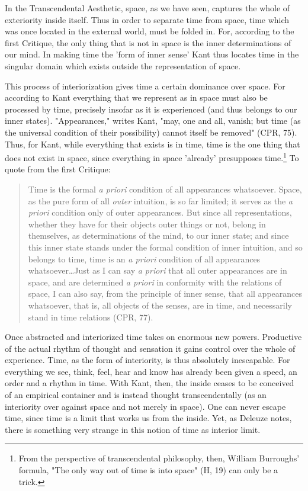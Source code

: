 In the Transcendental Aesthetic, space, as we have seen, captures the whole of exteriority inside itself. Thus in order to separate time from space, time which was once located in the external world, must be folded in. For, according to the first Critique, the only thing that is not in space is the inner determinations of our mind. In making time the 'form of inner sense' Kant thus locates time in the singular domain which exists outside the representation of space.

This process of interiorization gives time a certain dominance over space. For according to Kant everything that we represent as in space must also be processed by time, precisely insofar as it is experienced (and thus belongs to our inner states). "Appearances," writes Kant, "may, one and all, vanish; but time (as the universal condition of their possibility) cannot itself be removed" (CPR, 75). Thus, for Kant, while everything that exists is in time, time is the one thing that does not exist in space, since everything in space 'already' presupposes time.\footnote{From the perspective of transcendental philosophy, then, William Burroughs' formula, "The only way out of time is into space" (H, 19) can only be a trick.} To quote from the first Critique:

\begin{quote}
    Time is the formal \textit{a priori} condition of all appearances whatsoever. Space, as the pure form of all \textit{outer} intuition, is so far limited; it serves as the \textit{a priori} condition only of outer appearances. But since all representations, whether they have for their objects outer things or not, belong in themselves, as determinations of the mind, to our inner state; and since this inner state stands under the formal condition of inner intuition, and so belongs to time, time is an \textit{a priori} condition of all appearances whatsoever\dots Just as I can say \textit{a priori} that all outer appearances are in space, and are determined \textit{a priori} in conformity with the relations of space, I can also say, from the principle of inner sense, that all appearances whatsoever, that is, all objects of the senses, are in time, and necessarily stand in time relations (CPR, 77).
\end{quote}

Once abstracted and interiorized time takes on enormous new powers. Productive of the actual rhythm of thought and sensation it gains control over the whole of experience. Time, as the form of interiority, is thus absolutely inescapable. For everything we see, think, feel, hear and know has already been given a speed, an order and a rhythm in time. With Kant, then, the inside ceases to be conceived of an empirical container and is instead thought transcendentally (as an interiority over against space and not merely in space). One can never escape time, since time is a limit that works us from the inside. Yet, as Deleuze notes, there is something very strange in this notion of time as interior limit.

